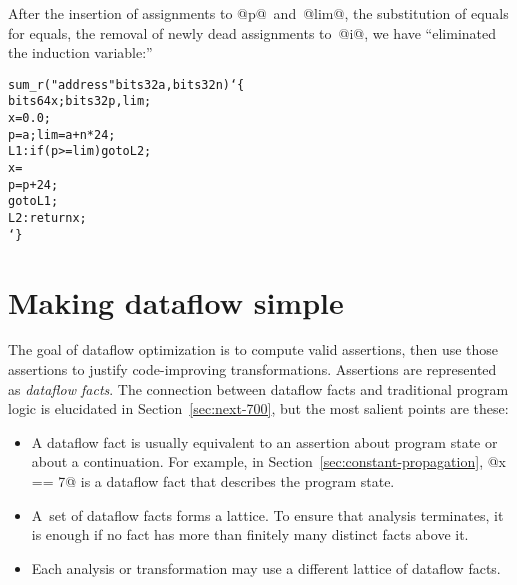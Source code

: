 \documentclass[blockstyle,preprint,nocopyrightspace]{sigplanconf}
\newcommand\lbr{\char`\{}
\newcommand\rbr{\char`\}}
\newcommand\secref[1]{Section~\ref{sec:#1}}
\newcommand\seclabel[1]{\label{sec:#1}}
\begin{document}
After the insertion of assignments to @p@~and~@lim@, the substitution
of equals for equals, the removal of newly dead assignments
to~@i@, we have ``eliminated the induction variable:''
\begin{alltt}
sum_r("address" bits32 a, bits32 n) \lbr
     bits64 x; bits32 p, lim;
     x = 0.0;
     p = a; lim = a + n * 24;
 L1: if ({p >= lim}) goto L2;
     x = %fadd(x, bits64[{p}]);
     p = p + 24;
     goto L1;
 L2: return x; 
\rbr
\end{alltt}

  
\section {Making dataflow simple}

\seclabel{making-simple}

\seclabel{create-analysis}

The goal of dataflow optimization is to compute valid
assertions, then use those assertions to justify code-improving
transformations.
%
%
Assertions are represented as
\emph{dataflow facts}.
The connection between dataflow facts and
 traditional 
program logic is
elucidated in \secref{next-700}, but the most salient points are
these:
\begin{itemize}
\item
A dataflow fact is usually equivalent to an assertion about program state or
about a continuation.
For example, in \secref{constant-propagation}, @x == 7@ is a dataflow
fact that describes the program state. 


\item
A~set of dataflow facts forms a lattice.
To ensure that analysis terminates,
it is enough if
no fact has more than finitely many distinct facts above it.
\item
Each analysis or transformation may use a different lattice of
dataflow facts.
\end{itemize}
\end{document}

